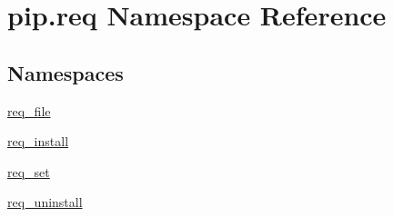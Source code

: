 \hypertarget{namespacepip_1_1req}{}\section{pip.\+req Namespace Reference}
\label{namespacepip_1_1req}
\subsection*{Namespaces}
\begin{DoxyCompactItemize}
\item 
 \hyperlink{namespacepip_1_1req_1_1req__file}{req\+\_\+file}
\item 
 \hyperlink{namespacepip_1_1req_1_1req__install}{req\+\_\+install}
\item 
 \hyperlink{namespacepip_1_1req_1_1req__set}{req\+\_\+set}
\item 
 \hyperlink{namespacepip_1_1req_1_1req__uninstall}{req\+\_\+uninstall}
\end{DoxyCompactItemize}
